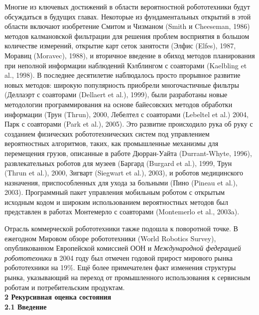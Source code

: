 \documentclass[10pt,a4paper]{article}
\begin{document}
Многие из ключевых достижений в области вероятностной робототехники будут обсуждаться в будущих главах. Некоторые из фундаментальных открытий в этой области включают изобретение Смитом и Чизманом (Smith и Cheeseman, 1986) методов калмановской фильтрации для решения проблем восприятия в большом количестве измерений, открытие карт сеток занятости (Элфис (Elfes), 1987, Моравиц (Moravec), 1988), и вторичное введение в обиход  методов планирования при неполной информации наблюдений Кэлблингом с соавторами (Kaelbling et al., 1998). В последнее десятилетие наблюдалось просто прорывное развитие новых методов: широкую популярность приобрели многочастичные фильтры (Деллаэрт с соавторами (Dellaert et al.), 1999), были разработаны новые методологии программирования на основе байесовских методов обработки информации (Трун (Thrun), 2000, Лебелтел с соавторами (Lebeltel et al.) 2004, Парк с соавторами (Park et al.), 2005). Это развитие происходило рука об руку с созданием физических робототехнических систем под управлением вероятностных алгоритмов, таких, как промышленные механизмы для перемещения грузов, описанные в работе Дюрран-Уайта (Durrant-Whyte, 1996), развлекательных роботов для музеев (Баргард (Burgard et al.), 1999, Трун (Thrun et al.), 2000, Зигварт (Siegwart et al.), 2003), и роботов медицинского назначения, приспособленных для ухода за больными (Пино (Pineau et al.), 2003). Программный пакет управления мобильным роботом с открытым исходным кодом  и широким использованием вероятностных методов был представлен в работах Монтемерло с соавторами (Montemerlo et al., 2003a).

Отрасль коммерческой робототехники также подошла к поворотной точке. В ежегодном Мировом обзоре робототехники (World Robotics Survey), опубликованном Европейской комиссией ООН и \textit{Международной федерацией робототехники} в 2004 году был отмечен годовой прирост мирового рынка робототехники на 19\%. Ещё более примечателен факт изменения структуры рынка, указывающий на переход от промышленного использования к сервисным роботам и потребительским продуктам.\\
 
\textbf{\Large2 Рекурсивная оценка состояния}\\

\textbf{2.1 Введение}\\
\end{document}
